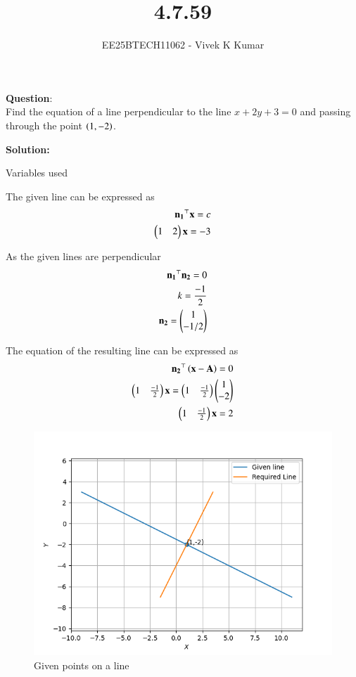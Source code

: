 \documentclass[journal]{IEEEtran}
\title{4.7.59}
\author{EE25BTECH11062 - Vivek K Kumar}
\begin{document}
\maketitle

\renewcommand{\thefigure}{\theenumi}
\renewcommand{\thetable}{\theenumi}


\textbf{Question}:\\
Find the equation of a line perpendicular to the line $x + 2y + 3 = 0$ and passing
through the point $\left(1, -2\right)$.

\textbf{Solution: }

\begin{table}[H]    
  \centering
  
  \caption{Variables used}
  \label{tab:4.7.59}
\end{table}

The given line can be expressed as 
\begin{align}
    \mathbf{n_1}^\top \mathbf{x} = c \\
    \begin{pmatrix}1 & 2\end{pmatrix}\mathbf{x} = -3\\
\end{align}

As the given lines are perpendicular
\begin{align}
    \mathbf{n_1}^\top \mathbf{n_2} = 0 \\
    k = \frac{-1}{2}\\
    \mathbf{n_2} = \begin{pmatrix}1 \\ -1/2\end{pmatrix}
\end{align}

The equation of the resulting line can be expressed as
\begin{align}
    \mathbf{n_2}^\top\left(\mathbf{x} - \mathbf{A}\right) = 0\\
    \begin{pmatrix}1 & \frac{-1}{2}\end{pmatrix}\mathbf{x} = \begin{pmatrix}1 & \frac{-1}{2}\end{pmatrix}\begin{pmatrix}1 \\ -2\end{pmatrix}\\
    \begin{pmatrix}1 & \frac{-1}{2}\end{pmatrix}\mathbf{x} = 2
\end{align}

\begin{figure}[H]
   \centering
  \includegraphics[width=0.64\columnwidth]{figs/fig.png}
   \caption{Given points on a line}
   \label{stemplot}
\end{figure}
\end{document}
